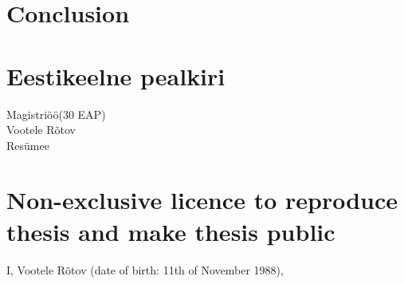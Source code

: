 \documentclass{style/master-thesis}
\begin{document}
\begin{comment}
Tip: We can use minipage to create a frame around some important information.
\begin{figure} [h]
\frame{
\begin{minipage}{\textwidth}
\begin{enumerate}
	\item integer division ($\opDiv$) - only usable between \typeInt types
	\item remainder ($\%$) - only usable between \typeInt types
\end{enumerate}
\end{minipage}
}
\caption{Arithmetic operations in revisited}
\label{fig:aritmOp_revisit}
\end{figure}

\end{comment}

\clearpage
\section{Conclusion} 



\newpage


\section{Eestikeelne pealkiri}
Magistriöö(30 EAP) \\
Vootele Rõtov \\
Resümee \\




\newpage

{}


\appendix
\pagebreak
\section*{\small Non-exclusive licence to reproduce thesis and make thesis public}


I, Vootele Rõtov (date of birth: 11th of November 1988),
\end{document}
